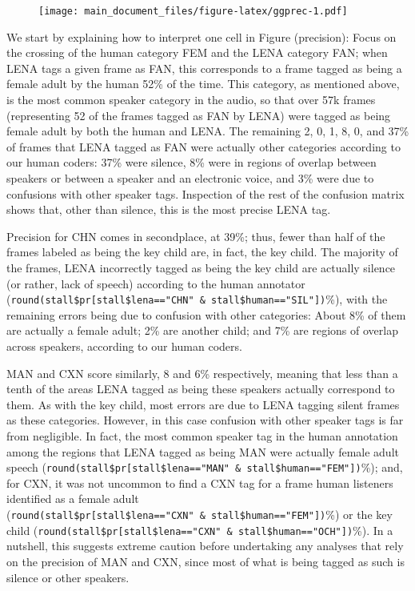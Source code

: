 \documentclass[english,floatsintext,man]{apa6}
\begin{document}
\begin{figure}
\centering
\texttt{[image: main\_document\_files/figure-latex/ggprec-1.pdf]}
\caption{}
\end{figure}

We start by explaining how to interpret one cell in Figure (precision):
Focus on the crossing of the human category FEM and the LENA category
FAN; when LENA tags a given frame as FAN, this corresponds to a frame
tagged as being a female adult by the human 52\% of the time. This
category, as mentioned above, is the most common speaker category in the
audio, so that over 57k frames (representing 52 of the frames tagged as
FAN by LENA) were tagged as being female adult by both the human and
LENA. The remaining 2, 0, 1, 8, 0, and 37\% of frames that LENA tagged
as FAN were actually other categories according to our human coders:
37\% were silence, 8\% were in regions of overlap between speakers or
between a speaker and an electronic voice, and 3\% were due to
confusions with other speaker tags. Inspection of the rest of the
confusion matrix shows that, other than silence, this is the most
precise LENA tag.

Precision for CHN comes in secondplace, at 39\%; thus, fewer than half
of the frames labeled as being the key child are, in fact, the key
child. The majority of the frames, LENA incorrectly tagged as being the
key child are actually silence (or rather, lack of speech) according to
the human annotator
(\texttt{round(stall\$pr{[}stall\$lena=="CHN"\ \&\ stall\$human=="SIL"{]})}\%),
with the remaining errors being due to confusion with other categories:
About 8\% of them are actually a female adult; 2\% are another child;
and 7\% are regions of overlap across speakers, according to our human
coders.

MAN and CXN score similarly, 8 and 6\% respectively, meaning that less
than a tenth of the areas LENA tagged as being these speakers actually
correspond to them. As with the key child, most errors are due to LENA
tagging silent frames as these categories. However, in this case
confusion with other speaker tags is far from negligible. In fact, the
most common speaker tag in the human annotation among the regions that
LENA tagged as being MAN were actually female adult speech
(\texttt{round(stall\$pr{[}stall\$lena=="MAN"\ \&\ stall\$human=="FEM"{]})}\%);
and, for CXN, it was not uncommon to find a CXN tag for a frame human
listeners identified as a female adult
(\texttt{round(stall\$pr{[}stall\$lena=="CXN"\ \&\ stall\$human=="FEM"{]})}\%)
or the key child
(\texttt{round(stall\$pr{[}stall\$lena=="CXN"\ \&\ stall\$human=="OCH"{]})}\%).
In a nutshell, this suggests extreme caution before undertaking any
analyses that rely on the precision of MAN and CXN, since most of what
is being tagged as such is silence or other speakers.
\end{document}
